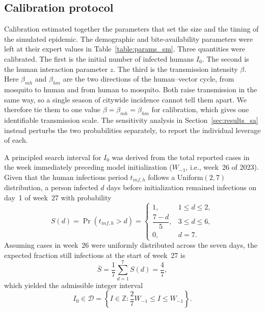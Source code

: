 \documentclass[applsci,article,accept,pdftex,moreauthors]{Definitions/mdpi}
\begin{document}
\subsection{Calibration protocol}
\label{sec:calibration}

Calibration estimated together the parameters that set the size and the timing of the simulated epidemic. The demographic and bite-availability parameters were left at their expert values in Table~\ref{table:params_sm}. Three quantities were calibrated. The first is the initial number of infected humans $I_0$. The second is the human interaction parameter $z$. The third is the transmission intensity $\beta$. Here $\beta_{mh}$ and $\beta_{hm}$ are the two directions of the human--vector cycle, from mosquito to human and from human to mosquito. Both raise transmission in the same way, so a single season of citywide incidence cannot tell them apart. We therefore tie them to one value $\beta=\beta_{mh}=\beta_{hm}$ for calibration, which gives one identifiable transmission scale. The sensitivity analysis in Section~\ref{sec:results_sa} instead perturbs the two probabilities separately, to report the individual leverage of each.

A principled search interval for $I_0$ was derived from the total reported cases in the week immediately preceding model initialization ($W_{-1}$, i.e., week~26 of 2023). Given that the human infectious period $t_{inf,h}$ follows a Uniform$(2,7)$ distribution, a person infected $d$ days before initialization remained infectious on day~1 of week~27 with probability
\begin{equation}
S(d) = \Pr(t_{inf,h} > d) =
\begin{cases}
1, & 1 \le d \le 2, \\
\dfrac{7-d}{5}, & 3 \le d \le 6, \\
0, & d = 7.
\end{cases}
\label{eq:survival}
\end{equation}
Assuming cases in week~26 were uniformly distributed across the seven days, the expected fraction still infectious at the start of week~27 is
\begin{equation}
\bar{S} = \frac{1}{7}\sum_{d=1}^{7} S(d) = \frac{4}{7},
\label{eq:sbar}
\end{equation}
which yielded the admissible integer interval
\begin{equation}
I_0 \in \mathcal{D} = \left\{I \in \mathbb{Z} : \frac{2}{7}W_{-1} \le I \le W_{-1}\right\}.
\label{eq:domain}
\end{equation}
\end{document}
